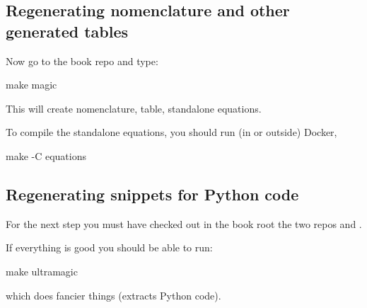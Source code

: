 \subsection{Regenerating nomenclature and other generated tables}



Now go to the book repo and type:

\begin{console}
make magic
\end{console}

This will create nomenclature, table, standalone equations.

To compile the standalone equations, you should run (in or outside) Docker,

\begin{console}
make -C equations
\end{console}


\subsection{Regenerating snippets for Python code}


For the next step you must have checked out in the book root the two repos
 and .


If everything is good you should be able to run:
\begin{console}
make ultramagic
\end{console}
which does fancier things (extracts Python code).
